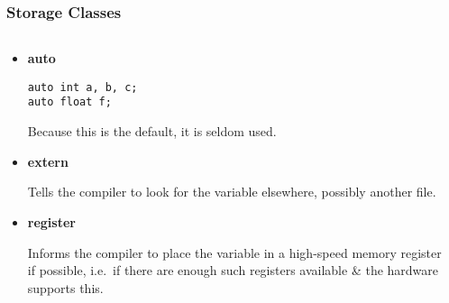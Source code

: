 \begin{frame}[fragile]
\frametitle{Storage Classes}

\begin{columns}

\begin{column}{0.45\textwidth}
\begin{itemize}[<+->]
\item {\bf auto}
\begin{verbatim}
auto int a, b, c;
auto float f;
\end{verbatim}
Because this is the default, it is seldom used.

\item {\bf extern}

Tells the compiler to look for the variable elsewhere,
possibly another file.

\item {\bf register}

Informs the compiler to place the variable in a high-speed
memory register if possible, i.e.\ if there are enough such
registers available \& the hardware supports this.
\end{itemize}
\end{column}

\pause
\begin{column}{0.45\textwidth}

\end{column}

\end{columns}
\end{frame}
